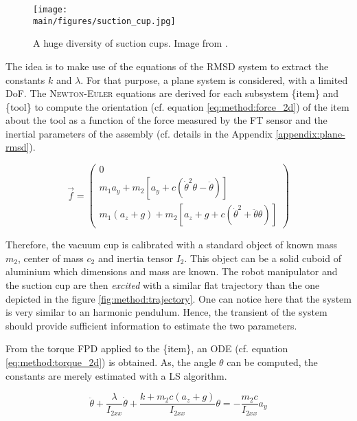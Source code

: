 \documentclass[/home/francois/latex/report/main.tex]{subfiles}
\begin{document}
\begin{figure}[h]
  \centering
  \texttt{[image: \\main/figures/suction\_cup.jpg]}
  \caption{A huge diversity of suction cups. Image from \cite{Piab2020}.}
  \label{fig:method:suction-cups}
\end{figure}

The idea is to make use of the equations of the \ac{RMSD} system to extract the constants $k$ and $\lambda$. For that purpose, a plane system is considered, with a limited \ac{DoF}. The \textsc{Newton-Euler} equations are derived for each subsystem \{item\} and \{tool\} to compute the orientation (cf. equation \ref{eq:method:force_2d}) of the item about the tool as a function of the force measured by the \ac{FT} sensor and the inertial parameters of the assembly (cf. details in the Appendix \ref{appendix:plane-rmsd}).

\begin{equation}
  \label{eq:method:force_2d}
  \overrightarrow{f}
  =
  \begin{pmatrix}
  0 \\
  m_1 a_y + m_2 [a_y + c (\dot{\theta}^2 \theta - \ddot{\theta})] \\
  m_1 (a_z + g) + m_2 [a_z + g + c (\dot{\theta}^2 + \ddot{\theta} \theta)]
  \end{pmatrix}
\end{equation}

Therefore, the vacuum cup is calibrated with a standard object of known mass $m_2$, center of mass $c_2$ and inertia tensor $I_2$. This object can be a solid cuboid of aluminium which dimensions and mass are known. The robot manipulator and the suction cup are then \textit{excited} with a similar flat trajectory than the one depicted in the figure \ref{fig:method:trajectory}. One can notice here that the system is very similar to an harmonic pendulum. Hence, the transient of the system should provide sufficient information to estimate the two parameters.

From the torque \ac{FPD} applied to the \{item\}, an \ac{ODE} (cf. equation \ref{eq:method:torque_2d}) is obtained. As, the angle $\theta$ can be computed, the constants are merely estimated with a \ac{LS} algorithm.

\begin{equation}
  \label{eq:method:torque_2d}
 \ddot{\theta} + \frac{\lambda}{I_{2xx}} \dot{\theta} + \frac{k + m_2 c (a_z + g)}{I_{2xx}} \theta = - \frac{m_2 c}{I_{2xx}} a_y
\end{equation}
\end{document}

